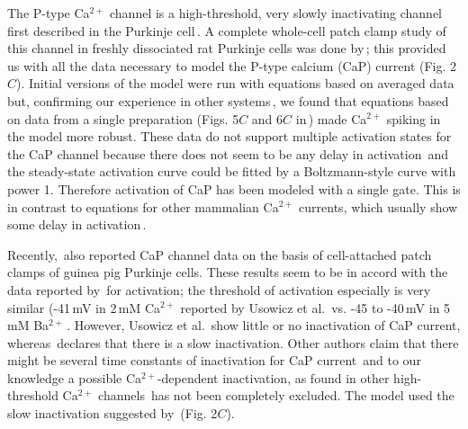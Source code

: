 \documentclass[12pt]{article}
\begin{document}
The P-type Ca$^{2+}$ channel is a high-threshold, very slowly inactivating channel first described in the Purkinje cell\,\cite{R:1980ly}. A complete whole-cell patch clamp study of this channel in freshly dissociated rat Purkinje cells was done by\,\cite{Regan:1991ly}; this provided us with all the data necessary to model the P-type calcium (CaP) current (Fig. 2$C$). Initial versions of the model were run with equations based on averaged data\,\cite{Regan:1991ly} but, confirming our experience in other systems\,\cite{De-Schutter-E:1993fu}, we found that equations based on data from a single preparation (Figs. 5$C$ and 6$C$ in\,\cite{Regan:1991ly}) made Ca$^{2+}$ spiking in the model more robust. These data do not support multiple activation states for the CaP channel because there does not seem to be any delay in activation\,\cite{hodgkin52:_quantitative_description} and the steady-state activation curve could be fitted by a Boltzmann-style curve with power 1. Therefore activation of CaP has been modeled with a single gate. This is in contrast to equations for other mammalian Ca$^{2+}$ currents, which usually show some delay in activation\,\cite{Chen:1990ve, Kay:1987ar}.

Recently,\,\cite{Usowicz:1992bh, Usowicz:1992qf} also reported CaP channel data on the basis of cell-attached patch clamps of guinea pig Purkinje cells. These results seem to be in accord with the data reported by\,\cite{Regan:1991ly} for activation; the threshold of activation especially is very similar (-41\,mV in 2\,mM Ca$^{2+}$ reported by Usowicz et al.\,\cite{Usowicz:1992bh} vs. -45 to -40\,mV in 5\,mM Ba$^{2+}$\,\cite{Regan:1991ly}. However, Usowicz et al.\,\cite{Usowicz:1992qf} show little or no inactivation of CaP current, whereas\,\cite{Regan:1991ly} declares that there is a slow inactivation. Other authors claim that there might be several time constants of inactivation for CaP current\,\cite{Hockberger:1991dq} and to our knowledge a possible Ca$^{2+}$-dependent inactivation, as found in other high-threshold Ca$^{2+}$ channels\,\cite{Fox:1987zr} has not been completely excluded. The model used the slow inactivation suggested by\,\cite{Regan:1991ly} (Fig. 2$C$).



\end{document}
